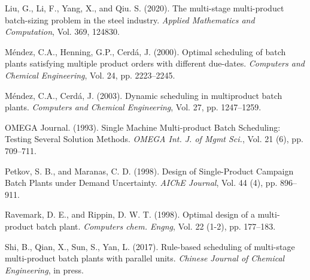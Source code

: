 \documentclass[authoryear,manuscript,12pt]{elsarticle}
\begin{document}
\begin{thebibliography}{1}
Liu, G., Li, F., Yang, X., and Qiu. S. (2020). The multi-stage multi-product batch-sizing problem in the steel industry. {\it  Applied Mathematics and Computation}, Vol. 369, 124830.

Méndez, C.A., Henning, G.P., Cerdá, J. (2000). Optimal scheduling of batch plants satisfying multiple product
orders with different due-dates. {\it Computers and Chemical Engineering}, Vol. 24, pp. 2223--2245.

Méndez, C.A., Cerdá, J. (2003). Dynamic scheduling in multiproduct batch plants. {\it Computers and Chemical Engineering}, Vol. 27, pp. 1247--1259.

OMEGA Journal. (1993). Single Machine Multi-product Batch Scheduling: Testing Several Solution Methods. {\it  OMEGA Int. J. of Mgmt Sci.}, Vol. 21 (6), pp. 709--711.

Petkov, S. B., and Maranas, C. D. (1998). Design of Single-Product Campaign Batch Plants under Demand Uncertainty. {\it  AIChE Journal}, Vol. 44 (4), pp. 896--911.

Ravemark, D. E., and Rippin, D. W. T. (1998). Optimal design of a multi-product batch plant. {\it Computers chem. Engng}, Vol. 22 (1-2), pp. 177--183.

Shi, B., Qian, X., Sun, S., Yan, L. (2017). Rule-based scheduling of multi-stage multi-product batch plants with parallel units. {\it Chinese Journal of Chemical Engineering}, in press.

\end{thebibliography}
\end{document}
